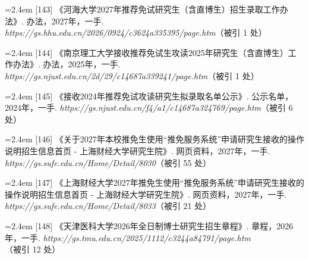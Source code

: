 {\noindent\hangindent=2.4em \label{src:S0179}{\color{cAccent}[143]} 《河海大学2027年推荐免试研究生（含直博生）招生录取工作办法》. 办法，2027年，一手. \textit{https://gs.hhu.edu.cn/2026/0924/c3624a335395/page.htm}（被引 1 处）\par
\vspace{0.6pt}
\vspace{3.5pt}\par
\nopagebreak\vspace{1pt}
\noindent\hangindent=2.4em \label{src:S0180}{\color{cAccent}[144]} 《南京理工大学接收推荐免试生攻读2025年研究生（含直博生）工作办法》. 办法，2025年，一手. \textit{https://gs.njust.edu.cn/2d/29/c14687a339241/page.htm}（被引 1 处）\par
\vspace{0.6pt}
\noindent\hangindent=2.4em \label{src:S0181}{\color{cAccent}[145]} 《接收2024年推荐免试攻读研究生拟录取名单公示》. 公示名单，2024年，一手. \textit{https://gs.njust.edu.cn/f4/a1/c14687a324769/page.htm}（被引 6 处）\par
\vspace{0.6pt}
\vspace{3.5pt}\par
\nopagebreak\vspace{1pt}
\noindent\hangindent=2.4em \label{src:S0182}{\color{cAccent}[146]} 《关于2027年本校推免生使用“推免服务系统”申请研究生接收的操作说明\textbar{}招生信息\textbar{}首页 - 上海财经大学研究生院》. 网页资料，2027年，一手. \textit{https://gs.sufe.edu.cn/Home/Detail/8030}（被引 55 处）\par
\vspace{0.6pt}
\noindent\hangindent=2.4em \label{src:S0183}{\color{cAccent}[147]} 《上海财经大学2027年推免生使用“推免服务系统”申请研究生接收的操作说明\textbar{}招生信息\textbar{}首页 - 上海财经大学研究生院》. 网页资料，2027年，一手. \textit{https://gs.sufe.edu.cn/Home/Detail/8033}（被引 21 处）\par
\vspace{0.6pt}
\vspace{3.5pt}\par
\nopagebreak\vspace{1pt}
\noindent\hangindent=2.4em \label{src:S0184}{\color{cAccent}[148]} 《天津医科大学2026年全日制博士研究生招生章程》. 章程，2026年，一手. \textit{https://gs.tmu.edu.cn/2025/1112/c3244a84791/page.htm}（被引 12 处）\par
}
